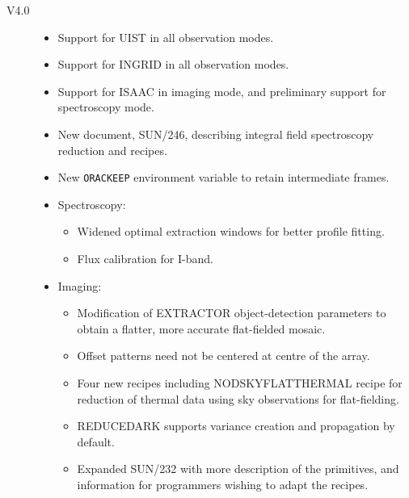 \documentclass[twoside,11pt]{article}
\newcommand{\xref}[3]{#1}
\renewcommand{\_}{\texttt{\symbol{95}}}
\begin{document}
\begin{description}

\item[V4.0]

\begin{itemize}

\item Support for UIST in all observation modes.

\item Support for INGRID in all observation modes.

\item Support for ISAAC in imaging mode, and preliminary support for
spectroscopy mode.

\item New document, \xref{SUN/246}{sun246}{}, describing integral field
  spectroscopy reduction and recipes.

\item New \texttt{ORAC\_KEEP} environment variable to retain intermediate
  frames.

\item Spectroscopy:

\begin{itemize}

\item Widened optimal extraction windows for better profile fitting.

\item Flux calibration for I-band.

\end{itemize}

\item Imaging:

\begin{itemize}

\item Modification of EXTRACTOR object-detection parameters to obtain a
    flatter, more accurate flat-fielded mosaic.

\item Offset patterns need not be centered at centre of the array.

\item Four new recipes including NOD\_SKY\_FLAT\_THERMAL recipe for reduction
    of thermal data using sky observations for flat-fielding.

\item REDUCE\_DARK supports variance creation and propagation by default.

\item Expanded \xref{SUN/232}{sun232}{} with more description of the
  primitives, and information for programmers wishing to adapt the recipes.


\end{itemize}
\end{itemize}
\end{description}
\end{document}
